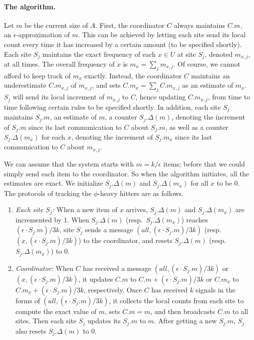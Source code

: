 \documentclass[10pt]{article}
\newcommand{\eps}{\epsilon}
\begin{document}
\paragraph{The algorithm.}
Let $m$ be the current size of $A$. First, the coordinator $C$
always maintains $C.m$, an $\eps$-approximation of $m$.  This can
be achieved by letting each site send its local count every time
it has increased by a certain amount (to be specified shortly).
Each site $S_j$ maintains the exact frequency of each $x \in U$ at
site $S_j$, denoted $m_{x,j}$, at all times. The overall frequency
of $x$ is $m_x = \sum_j m_{x,j}$. Of course, we cannot afford to
keep track of $m_x$ exactly.  Instead, the coordinator $C$ maintains
an underestimate $C.m_{x,j}$ of $m_{x,j}$, and sets $C.m_x =
\sum_j C.m_{x,j}$ as an estimate of $m_x$.  $S_j$ will send its
local increment of $m_{x,j}$ to $C$, hence updating $C.m_{x,j}$,
from time to time following certain rules to be specified shortly.
In addition, each site $S_j$ maintains ${S_j}.m$, an estimate of
$m$, a counter ${S_j}.\Delta(m)$, denoting the increment of
$S_j.m$ since its last communication to $C$ about $S_j.m$, as well
as a counter ${S_j}.\Delta(m_x)$ for each $x$, denoting the
increment of ${S_j}.m_x$ since its last communication to $C$ about
$m_{x,j}$.

We can assume that the system starts with $m = k/\eps$ items;
before that we could simply send each item to the coordinator.  So
when the algorithm initiates, all the estimates are exact. We
initialize ${S_j}.\Delta(m)$ and ${S_j}.\Delta(m_x)$ for all $x$
to be 0. The protocols of tracking the $\phi$-heavy hitters are as
follows.
\begin{enumerate}
\item {\em Each site $S_j$:} When a new item of $x$ arrives,
${S_j}.\Delta(m)$ and ${S_j}.\Delta(m_x)$ are incremented by 1.
When ${S_j}.\Delta(m)$ (resp.\ ${S_j}.\Delta(m_x)$) reaches $(\eps
\cdot {S_j}.m)/3k$, site $S_j$ sends a message $(all, (\eps \cdot
{S_j}.m)/3k)$ (resp.\ $(x,(\eps \cdot {S_j}.m)/3k)$) to the
coordinator, and resets ${S_j}.\Delta(m)$ (resp.\
${S_j}.\Delta(m_x)$) to 0.

\item {\em Coordinator:} When $C$ has received a message $(all,
(\eps \cdot {S_j}.m)/3k)$ or $(x,(\eps \cdot {S_j}.m)/3k)$, it
updates $C.m$ to $C.m + (\eps \cdot {S_j}.m)/3k$ or $C.m_x$ to
$C.m_x + (\eps \cdot {S_j}.m)/3k$, respectively. Once $C$ has
received $k$ signals in the forms of $(all, (\eps \cdot
{S_j}.m)/3k)$, it collects the local counts from each site to compute
the exact value of $m$, sets $C.m = m$, and then broadcasts $C.m$
to all sites.  Then each site $S_j$ updates its ${S_j}.m$ to $m$.
After getting a new $S_j.m$, $S_j$ also resets $S_j.\Delta(m)$ to
0.
\end{enumerate}
\end{document}
